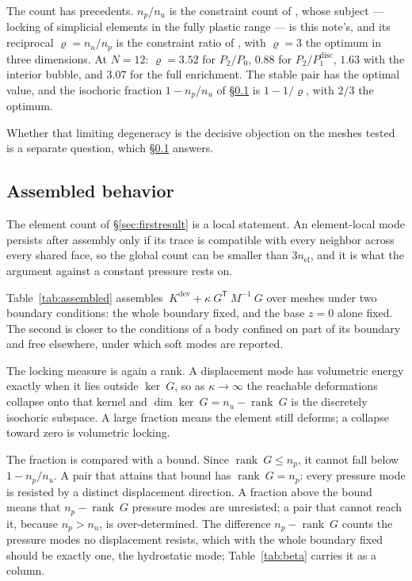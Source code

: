 \documentclass[11pt]{article}
\newcommand{\transpose}[1]{#1^{\mathsf{T}}}
\newcommand{\supdev}{^{\mathrm{dev}}}
\theoremstyle{definition}
\theoremstyle{plain}
\begin{document}
The count has precedents. $n_p/n_u$ is the constraint count of
\citet{NagtegaalParksRice:1974}, whose subject --- locking of simplicial
elements in the fully plastic range --- is this note's, and its reciprocal
$\varrho = n_u/n_p$ is the constraint ratio of \citet[\S4.3.7]{Hughes:1987},
with $\varrho = 3$ the optimum in three dimensions. At $N = 12$:
$\varrho = 3.52$ for $P_2/P_0$, $0.88$ for $P_2/P_1^{\mathrm{disc}}$, $1.63$
with the interior bubble, and $3.07$ for the full enrichment. The stable pair
has the optimal value, and the isochoric fraction $1 - n_p/n_u$ of
\S\ref{sec:assembled} is $1 - 1/\varrho$, with $2/3$ the optimum.

Whether that limiting degeneracy is the decisive objection on the meshes
tested is a separate question, which \S\ref{sec:assembled} answers.

\subsection{Assembled behavior}
\label{sec:assembled}

The element count of \S\ref{sec:firstresult} is a local statement. An
element-local mode persists after assembly only if its trace is compatible
with every neighbor across every shared face, so the global count can be
smaller than $3n_{\mathrm{el}}$, and it is what the argument against a
constant pressure rests on.

Table~\ref{tab:assembled} assembles $~K\supdev + \kappa \transpose{~G} ~M^{-1}
~G$ over meshes under two boundary conditions: the whole boundary fixed, and
the base $z = 0$ alone fixed. The second is closer to the conditions of a body confined
on part of its boundary and free elsewhere, under which soft modes are
reported.

The locking measure is again a rank. A displacement mode has volumetric
energy exactly when it lies outside $\ker ~G$, so as $\kappa \to \infty$ the
reachable deformations collapse onto that kernel and
$\dim\ker ~G = n_u - \operatorname{rank} ~G$ is the discretely isochoric
subspace. A large fraction means the element still deforms; a collapse toward
zero is volumetric locking.

The fraction is compared with a bound. Since
$\operatorname{rank}~G \le n_p$, it cannot fall below $1 - n_p/n_u$. A pair
that attains that bound has $\operatorname{rank}~G = n_p$: every pressure mode
is resisted by a distinct displacement direction. A fraction above the bound
means that $n_p - \operatorname{rank}~G$ pressure modes are unresisted; a pair
that cannot reach it, because $n_p > n_u$, is over-determined. The difference $n_p - \operatorname{rank}~G$ counts the
pressure modes no displacement resists, which with the whole boundary fixed
should be exactly one, the hydrostatic mode; Table~\ref{tab:beta} carries it
as a column.
\end{document}
